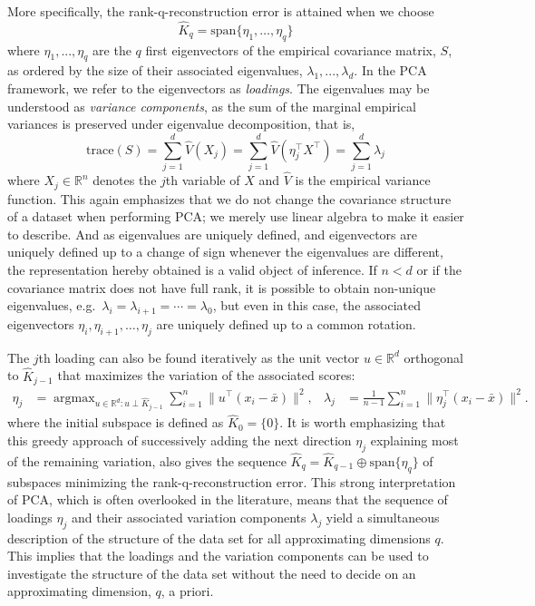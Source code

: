 \documentclass[titlepage,11pt,twoside]{article}
\newcommand{\RR}{\mathbb{R}}
\DeclareMathOperator*{\argmax}{argmax}
\begin{document}
More specifically, the rank-q-reconstruction error is attained when we choose
\begin{equation*}
\hat{K}_q = \text{span}\{\eta_1,\dotsc,\eta_q\}
\end{equation*}
where $\eta_1, ..., \eta_q$ are the $q$ first eigenvectors of the empirical covariance matrix, $S$, as ordered by the size of their associated eigenvalues, $\lambda_1, ..., \lambda_d$. In the PCA framework, we refer to the eigenvectors as \textit{loadings}. The eigenvalues may be understood as \textit{variance components}, as the sum of the marginal empirical variances is preserved under eigenvalue decomposition, that is,
$$\text{trace}(S) = \sum_{j=1}^d \hat{V}(X_j) = \sum_{j=1}^d \hat{V}(\eta_j^\top X^\top) = \sum_{j=1}^d \lambda_j$$
where $X_j \in \RR^n$ denotes the $j$th variable of $X$ and $\hat{V}$ is the empirical variance function. This again emphasizes that we do not change the covariance structure of a dataset when performing PCA; we merely use linear algebra to make it easier to describe. And as eigenvalues are uniquely defined, and eigenvectors are uniquely defined up to a change of sign whenever the eigenvalues are different, the representation hereby obtained is a valid object of inference. If $n < d$ or if the covariance matrix does not have full rank, it is possible to obtain non-unique eigenvalues, e.g.\ $\lambda_i=\lambda_{i+1}=\dotsm=\lambda_0$, but even in this case, the associated eigenvectors $\eta_i,\eta_{i+1},\dotsc,\eta_j$ are uniquely defined up to a common rotation.

The $j$th loading can also be found iteratively as the unit vector $u \in \RR^d$ orthogonal to $\hat{K}_{j-1}$ that maximizes the variation of the associated scores:
\begin{align*}
\eta_j &= \argmax_{u \in \RR^d\colon u \perp \hat{K}_{j-1}} \sum_{i=1}^n \lVert u^\top (x_i - \bar{x}) \rVert^2, &
\lambda_j &= \frac{1}{n-1} \sum_{i=1}^n \lVert \eta_j^\top (x_i - \bar{x}) \rVert^2.
\end{align*}
where the initial subspace is defined as $\hat{K}_0 = \{0\}$. It is worth emphasizing that this greedy approach of successively adding the next direction $\eta_j$ explaining most of the remaining variation, also gives the sequence $\hat{K}_q = \hat{K}_{q-1} \oplus \text{span} \{\eta_q\}$ of subspaces minimizing the rank-q-reconstruction error. This strong interpretation of PCA, which is often overlooked in the literature, means that the sequence of loadings $\eta_j$ and their associated variation components $\lambda_j$ yield a simultaneous description of the structure of the data set for all approximating dimensions $q$. This implies that the loadings and the variation components can be used to investigate the structure of the data set without the need to decide on an approximating dimension, $q$, a priori.
\end{document}
